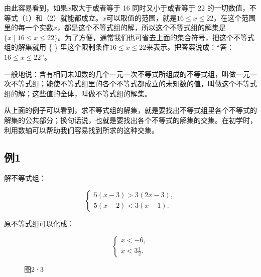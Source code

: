 由此容易看到，如果\(x\)取大于或者等于 16 同时又小于或者等于 22
的一切数值，不等式（1）和（2）就能都成立。\(x\)可以取值的范围，就是\(16 \leqslant x \leqslant 22\)，在这个范围里的每一个实数\(x\)，都是这个不等式组的解，所以这个不等式组的解集是\(\{x \mid 16 \leqslant x \leqslant 22\}\)。为了方便，通常我们也可省去上面的集合符号，把这个不等式组的解集就用
\{ \}
里这个限制条件\(16 \leqslant x \leqslant 22\)来表示。把答案说成：``答：\(16 \leqslant x \leqslant 22\)''。

一般地说：含有相同未知数的几个一元一次不等式所组成的不等式组，叫做一元一次不等式组；能使不等式组里的各个不等式都成立的未知数的值，叫做这个不等式组的解；这些值的全体，叫做不等式组的解集。

从上面的例子可以看到，求不等式组的解集，就是要找出不等式组里各个不等式的解集的公共部分；换句话说，也就是要找出各个不等式的解集的交集。在初学时，利用数轴可以帮助我们容易找到所求的这种交集。

\subsection{例1}

解不等式组：

\[
\left\{ \begin{array}{l} 5 (x - 3) > 3 (2 x - 3), \\ 5 (x - 2) < 3 (x - 1). \end{array} \right.
\]

 原不等式组可以化成：

\[
\left\{ \begin{array}{l} x < - 6, \\ x < 3 \frac{1}{2}. \end{array} \right.
\]

\begin{figure}
\centering
\caption{图2·3}
\end{figure}


